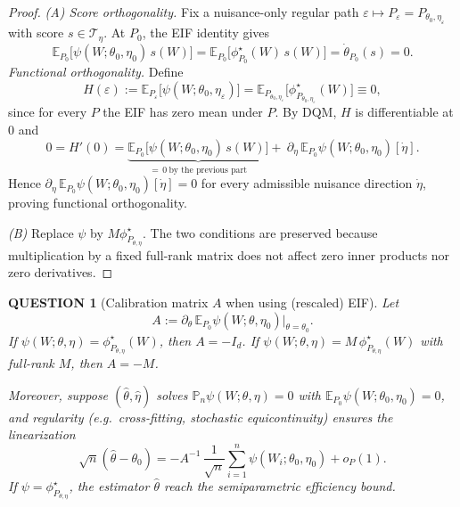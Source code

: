 \documentclass[12pt]{article}
\renewcommand{\(}{\left(}%
\renewcommand{\)}{\right)}%
\renewcommand{\[}{\left[}%
\renewcommand{\]}{\right]}%
\newtheorem{question}{QUESTION}[section]}
\newtheorem{proof}{Proof.}}
\begin{document}
\begin{proof}
\emph{(A) Score orthogonality.}
Fix a nuisance-only regular path $\varepsilon\mapsto P_\varepsilon=P_{\theta_0,\eta_\varepsilon}$ with score $s\in\mathcal T_\eta$.
At $P_0$, the EIF identity gives
\begin{equation*}
\mathbb E_{P_0}\!\big[\psi(W;\theta_0,\eta_0)\,s(W)\big]
=\mathbb E_{P_0}\!\big[\phi^\star_{P_0}(W)\,s(W)\big]
=\dot\theta_{P_0}(s)=0.
\end{equation*}
\emph{Functional orthogonality.}
Define
\begin{equation*}
H(\varepsilon):=\mathbb E_{P_\varepsilon}\!\big[\psi(W;\theta_0,\eta_\varepsilon)\big]
=\mathbb E_{P_{\theta_0,\eta_\varepsilon}}\!\big[\phi^\star_{P_{\theta_0,\eta_\varepsilon}}(W)\big]\equiv 0,
\end{equation*}
since for every $P$ the EIF has zero mean under $P$. By DQM, $H$ is differentiable at $0$ and
\begin{equation*}
0=H'(0)=\underbrace{\mathbb E_{P_0}\!\big[\psi(W;\theta_0,\eta_0)\,s(W)\big]}_{=\,0\ \text{by the previous part}}
+\ \partial_\eta\,\mathbb E_{P_0}\psi(W;\theta_0,\eta_0)[\dot\eta].
\end{equation*}
Hence $\partial_\eta\,\mathbb E_{P_0}\psi(W;\theta_0,\eta_0)[\dot\eta]=0$ for every admissible nuisance direction $\dot\eta$, proving functional orthogonality.

\emph{(B)} Replace $\psi$ by $M\phi^\star_{P_{\theta,\eta}}$. The two conditions are preserved because multiplication by a fixed full-rank matrix does not affect zero inner products nor zero derivatives.
\end{proof}

\begin{question}[Calibration matrix $A$ when using (rescaled) EIF]
Let
\begin{equation*}
A:=\partial_\theta\,\mathbb E_{P_0}\psi(W;\theta,\eta_0)\big|_{\theta=\theta_0}.
\end{equation*}
If $\psi(W;\theta,\eta)=\phi^\star_{P_{\theta,\eta}}(W)$, then $A=-I_d$.
If $\psi(W;\theta,\eta)=M\,\phi^\star_{P_{\theta,\eta}}(W)$ with full-rank $M$, then $A=-M$.

Moreover, suppose $(\hat\theta,\hat\eta)$ solves $\mathbb P_n\psi(W;\theta,\eta)=0$ with $\mathbb E_{P_0}\psi(W;\theta_0,\eta_0)=0$, and regularity (e.g.\ cross-fitting, stochastic equicontinuity) ensures the linearization
\begin{equation*}
\sqrt n(\hat\theta-\theta_0)
=-A^{-1}\,\frac{1}{\sqrt n}\sum_{i=1}^n \psi(W_i;\theta_0,\eta_0)+o_P(1).
\end{equation*}
If $\psi=\phi^\star_{P_{\theta,\eta}}$, the estimator $\hat{\theta}$ reach the semiparametric efficiency bound. 
\end{question}
\end{document}
